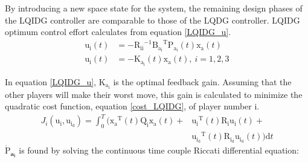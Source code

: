 \documentclass[conference]{IEEEtran}
\begin{document}
By introducing a new space state for the system, the remaining design phases of the LQIDG controller are comparable to those of the LQDG controller. LQIDG optimum control effort calculates from equation \eqref{LQIDG_u}.
\begin{equation}\label{LQIDG_u}
	\begin{split}
		\boldsymbol{\mathrm{u_i}}(t) &= -\boldsymbol{\mathrm{R_{ii}}}^{-1}\boldsymbol{\mathrm{B_{a_i}}}^\mathrm{T}\boldsymbol{\mathrm{P_{a_i}}}(t)\boldsymbol{\mathrm{x_a}}(t) \\
		\boldsymbol{\mathrm{u_i}}(t) &= - \boldsymbol{\mathrm{K_{a_i}}}(t)\boldsymbol{\mathrm{x_a}}(t),~ i = 1, 2, 3
	\end{split}
\end{equation}



In equation \eqref{LQIDG_u}, $\boldsymbol{\mathrm{K_{a_i}}}$ is the optimal feedback gain. Assuming that the other players will make their worst move, this gain is calculated to minimize the quadratic cost function, equation \eqref{cost_LQIDG}, of player number i.
\begin{equation}\label{cost_LQIDG}
    \begin{split}
        J_i( \boldsymbol{\mathrm{u_i}},  \boldsymbol{\mathrm{u_{i_d}}}) = \int_{0}^{T}\biggl (\boldsymbol{\mathrm{x_a}} ^\mathrm{T}(t) \boldsymbol{\mathrm{Q_i}} \boldsymbol{\mathrm{x_a}}(t)+
        &\boldsymbol{\mathrm{u_i}} ^\mathrm{T}(t) \boldsymbol{\mathrm{R_{i}}} \boldsymbol{\mathrm{u_i}}(t)+\\
        &\boldsymbol{\mathrm{u_{i_d}}} ^\mathrm{T}(t)\boldsymbol{\mathrm{ R_{i_d} u_{i_d}}}(t)
        \biggl )\mathrm{d}t
    \end{split} 
\end{equation}
$\boldsymbol{\dot{\mathrm{P}}_{a_i}}$ is found by solving the continuous time couple Riccati differential equation:
\end{document}

